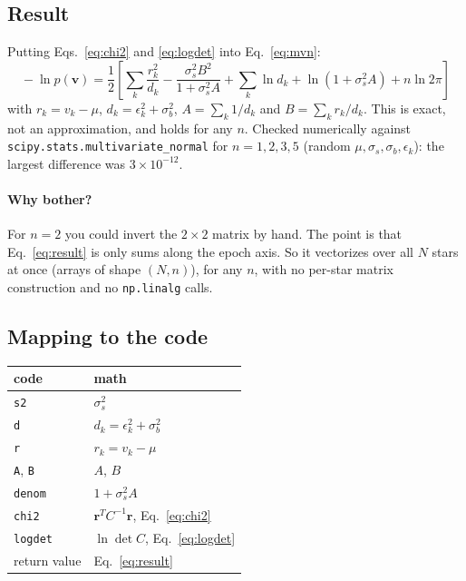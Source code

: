 \documentclass[11pt]{article}
\newcommand{\bv}{\mathbf{v}}
\newcommand{\br}{\mathbf{r}}
\begin{document}
\subsection{Result}
Putting Eqs.~\eqref{eq:chi2} and \eqref{eq:logdet} into Eq.~\eqref{eq:mvn}:
\begin{equation}
  \boxed{\;
  -\ln p(\bv) = \frac{1}{2}\left[
    \sum_k \frac{r_k^2}{d_k} - \frac{\sigma_s^2 B^2}{1 + \sigma_s^2 A}
    + \sum_k \ln d_k + \ln(1 + \sigma_s^2 A)
    + n\ln 2\pi \right]\;}
  \label{eq:result}
\end{equation}
with $r_k = v_k - \mu$, $d_k = \epsilon_k^2 + \sigma_b^2$, $A = \sum_k 1/d_k$ and $B = \sum_k r_k/d_k$.
This is exact, not an approximation, and holds for any $n$.
Checked numerically against \texttt{scipy.stats.multivariate\_normal} for $n = 1, 2, 3, 5$
(random $\mu, \sigma_s, \sigma_b, \epsilon_k$): the largest difference was $3\times10^{-12}$.

\paragraph{Why bother?}
For $n=2$ you could invert the $2\times 2$ matrix by hand.
The point is that Eq.~\eqref{eq:result} is only sums along the epoch axis.
So it vectorizes over all $N$ stars at once (arrays of shape $(N, n)$), for any $n$,
with no per-star matrix construction and no \texttt{np.linalg} calls.

\subsection{Mapping to the code}
\begin{center}
\begin{tabular}{ll}
\toprule
code & math \\
\midrule
\texttt{s2} & $\sigma_s^2$ \\
\texttt{d} & $d_k = \epsilon_k^2 + \sigma_b^2$ \\
\texttt{r} & $r_k = v_k - \mu$ \\
\texttt{A}, \texttt{B} & $A$, $B$ \\
\texttt{denom} & $1 + \sigma_s^2 A$ \\
\texttt{chi2} & $\br^T C^{-1}\br$, Eq.~\eqref{eq:chi2} \\
\texttt{logdet} & $\ln\det C$, Eq.~\eqref{eq:logdet} \\
return value & Eq.~\eqref{eq:result} \\
\bottomrule
\end{tabular}
\end{center}
\end{document}
